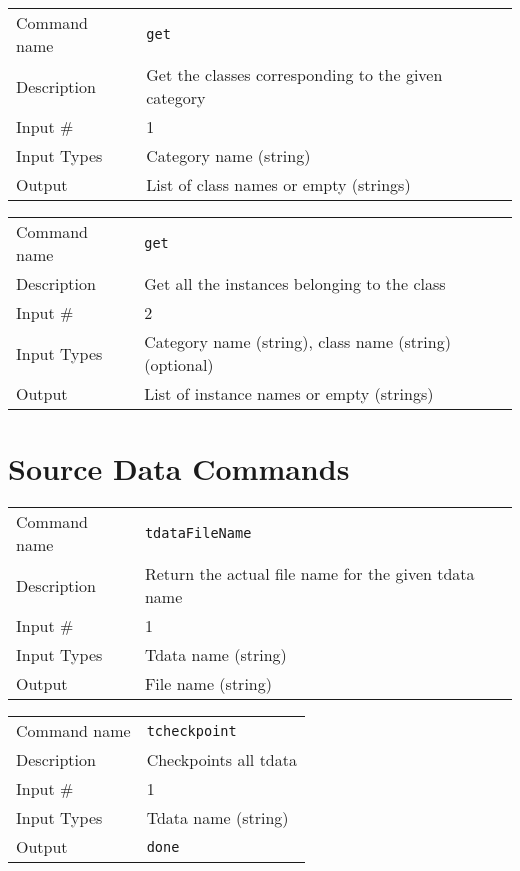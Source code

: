 \bigskip

\noindent
\begin{tabular}{l|p{5in}}
\hline
Command name & {\tt get} \\
Description  & Get the classes corresponding to the given category \\
Input \#     & 1 \\
Input Types  & Category name (string) \\
Output       & List of class names or empty (strings) \\
\hline
\end{tabular}

\bigskip

\noindent
\begin{tabular}{l|p{5in}}
\hline
Command name & {\tt get} \\
Description  & Get all the instances belonging to the class \\
Input \#     & 2 \\
Input Types  & Category name (string), class name (string) (optional) \\
Output       & List of instance names or empty (strings) \\
\hline
\end{tabular}

\section{Source Data Commands}

\noindent
\begin{tabular}{l|p{5in}}
\hline
Command name & {\tt tdataFileName} \\
Description  & Return the actual file name for the given tdata name \\
Input \#     & 1 \\
Input Types  & Tdata name (string) \\
Output       & File name (string) \\
\hline
\end{tabular}

\bigskip

\noindent
\begin{tabular}{l|p{5in}}
\hline
Command name & {\tt tcheckpoint} \\
Description  & Checkpoints all tdata \\
Input \#     & 1 \\
Input Types  & Tdata name (string) \\
Output       & {\tt done} \\
\hline
\end{tabular}

